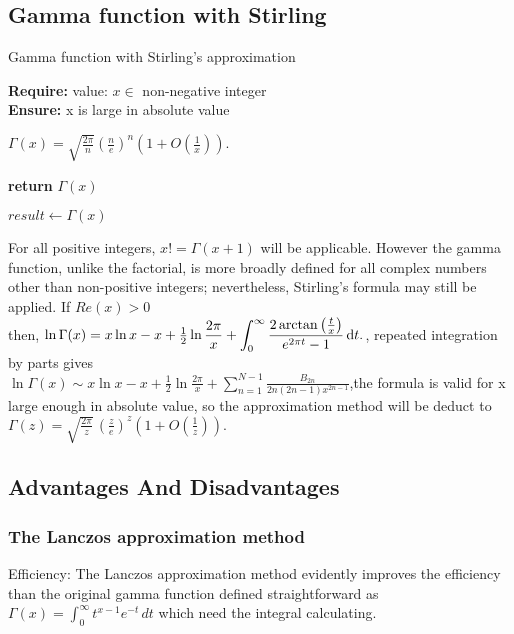 \documentclass[a4paper, 11pt]{article}
\begin{document}
\subsection{Gamma function with Stirling}
\begin{algorithm}

\caption{Gamma function with Stirling's approximation}

\textbf{Require:}  value: $x \in $ non-negative integer \\
\textbf{Ensure:} x is large in absolute value
\begin{algorithmic}[1]

    \State \indent $\Gamma (x) = {\sqrt {\frac{2\pi}{n}}{(\frac{n}{e})}^n(1+O(\frac{1}{x}))}.$  
    
    \State \textbf{return} $\Gamma (x)$
    \EndProcedure
\Statex

\State $result \leftarrow \Gamma (x)$ 
\end{algorithmic}
\end{algorithm}

For all positive integers, ${\displaystyle x!=\Gamma (x+1)}$ will be applicable. However  the gamma function, unlike the factorial, is more broadly defined for all complex numbers other than non-positive integers; nevertheless, Stirling's formula may still be applied. If $Re(x) > 0$\\ then, ${\displaystyle \ln \Gamma (x)=x\ln x-x+{\tfrac {1}{2}}\ln {\frac {2\pi }{x}}+\int _{0}^{\infty }{\frac {2\arctan \left({\frac {t}{x}}\right)}{e^{2\pi t}-1}}\,{\rm {d}}t.}$, repeated integration by parts gives\\${\displaystyle \ln \Gamma (x)\sim x\ln x-x+{\tfrac {1}{2}}\ln {\frac {2\pi }{x}}+\sum _{n=1}^{N-1}{\frac {B_{2n}}{2n(2n-1)x^{2n-1}}}}$,the formula is valid for x large enough in absolute value, so the approximation method will be deduct to ${\displaystyle \Gamma (z)={\sqrt {\frac {2\pi }{z}}}\,{\left({\frac {z}{e}}\right)}^{z}\left(1+O\left({\frac {1}{z}}\right)\right).}$

\subsection{Advantages And Disadvantages}
\subsubsection{ The Lanczos approximation method}
\indent \indent Efficiency: The Lanczos approximation method evidently improves the efficiency than the original gamma function defined straightforward as ${\displaystyle \Gamma (x)=\int _{0}^{\infty }t^{x-1}e^{-t}\,dt}$ which need the integral calculating. \\
\end{document}
